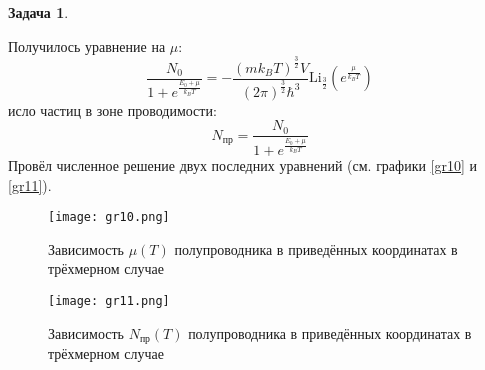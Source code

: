 \documentclass[12pt]{article}
\theoremstyle{definition}
\newtheorem{zad}{Задача}[section]
\begin{document}
\begin{zad}
\begin{enumerate}
\begin{equation}
    \end{equation}
    Получилось уравнение на $\mu$:
    \begin{equation}
        \boxed{\frac{N_0}{1+e^{\frac{E_0+\mu}{k_BT}}}=-\frac{(mk_BT)^\frac{3}{2}V}{(2\pi)^\frac{3}{2}\hbar^3}\text{Li}_\frac{3}{2}\left(e^\frac{\mu}{k_BT}\right)}
    \end{equation}
    исло частиц в зоне проводимости:
    \begin{equation}
        N_\text{пр}=\frac{N_0}{1+e^{\frac{E_0+\mu}{k_BT}}}
    \end{equation}
    Провёл численное решение двух последних уравнений (см. графики \ref{gr10} и \ref{gr11}).
    \begin{figure}
        \centering
        \texttt{[image: gr10.png]}
        \caption{Зависимость $\mu(T)$ полупроводника в приведённых координатах в трёхмерном случае}
        \label{gr8}
    \end{figure}
    \begin{figure}
        \centering
        \texttt{[image: gr11.png]}
        \caption{Зависимость $N_\text{пр}(T)$ полупроводника в приведённых координатах в трёхмерном случае}
        \label{gr9}
    \end{figure}
\end{enumerate}
\end{zad}
\end{document}
